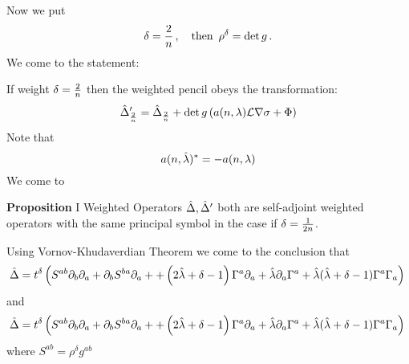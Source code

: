   Now we put
               $$
              \delta={2\over n}\,,\quad
 {\rm then}\,\,\, \rho^{\delta}=\det g\,.
                $$
We come to the statement:

     If weight ${\delta}={2\over n}$ then the weighted pencil
  obeys the transformation:
                $$
\hat\Delta'_{{2\over n}}=
\hat\Delta_{{2\over n}}+\det g\left(a(n,\lambda){\cal L}\nabla{\sigma}+\Phi\right)
                $$
Note  that
              $$
              a(n,\hat{\lambda})^*=-a(n,\lambda)
              $$
We come to

{\bf Proposition} I
Weighted Operators $\hat\Delta,\hat\Delta'$ 
both are self-adjoint weighted operators
with the same principal symbol in the case if $\delta={1\over 2n}$.

Using Vornov-Khudaverdian Theorem we come to the conclusion that
          $$
  \hat\Delta=t^{\delta}\left(S^{ab}\partial_b\partial_a+\partial_bS^{ba}\partial_a+
  +\left(2\hat{\lambda}+{\delta}-1\right){\Gamma}^a\partial_a+\hat{\lambda}\partial_a{\Gamma}^a+
\hat{\lambda}(\hat{\lambda}+{\delta}-1){\Gamma}^a{\Gamma}_a\right)\,
          $$ 
and        $$
  \hat\Delta=t^{\delta}\left(S^{ab}\partial_b\partial_a+\partial_bS^{ba}\partial_a+
  +\left(2\hat{\lambda}+{\delta}-1\right){\Gamma}^a\partial_a+\hat{\lambda}\partial_a{\Gamma}^a+
\hat{\lambda}(\hat{\lambda}+{\delta}-1){\Gamma}^a{\Gamma}_a\right)\,
          $$ 
where $S^{ab}=\rho^\delta g^{ab}$
\bye

